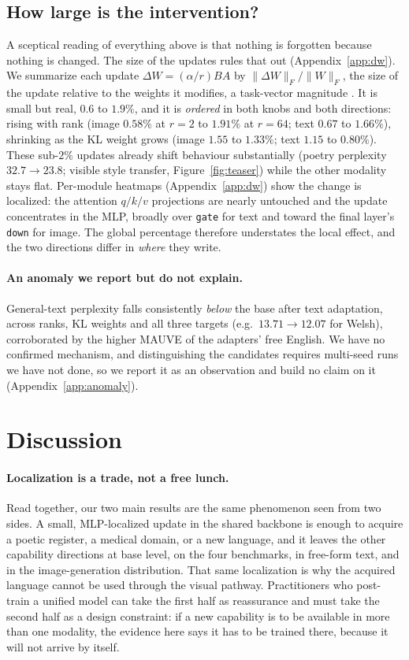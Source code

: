 \documentclass{article}
\begin{document}
\subsection{How large is the intervention?}
\label{sec:dw}
A sceptical reading of everything above is that nothing is forgotten because
nothing is changed. The size of the updates rules that out
(Appendix~\ref{app:dw}). We summarize each update
$\Delta W=(\alpha/r)BA$ by $\lVert\Delta W\rVert_F/\lVert W\rVert_F$, the size of
the update relative to the weights it modifies, a task-vector magnitude
\citep{ilharco2023task}. It is small but real, $0.6$ to $1.9\%$, and it is
\emph{ordered} in both knobs and both directions: rising with rank (image
$0.58\%$ at $r{=}2$ to $1.91\%$ at $r{=}64$; text $0.67$ to $1.66\%$), shrinking
as the KL weight grows (image $1.55$ to $1.33\%$; text $1.15$ to $0.80\%$). These
sub-$2\%$ updates already shift behaviour
substantially (poetry perplexity $32.7\to23.8$; visible style transfer,
Figure~\ref{fig:teaser}) while the other modality stays flat. Per-module heatmaps
(Appendix~\ref{app:dw}) show the change is localized: the attention $q/k/v$
projections are nearly untouched and the update concentrates in the MLP, broadly
over \texttt{gate} for text and toward the final layer's \texttt{down} for image.
The global percentage therefore understates the local effect, and the two
directions differ in \emph{where} they write.

\paragraph{An anomaly we report but do not explain.}
General-text perplexity falls consistently \emph{below} the base after text
adaptation, across ranks, KL weights and all three targets (e.g.\
$13.71\to12.07$ for Welsh), corroborated by the higher MAUVE of the adapters'
free English. We have no confirmed mechanism, and distinguishing the candidates
requires multi-seed runs we have not done, so we report it as an observation and
build no claim on it (Appendix~\ref{app:anomaly}).

\section{Discussion}
\paragraph{Localization is a trade, not a free lunch.}
Read together, our two main results are the same phenomenon seen from two sides.
A small, MLP-localized update in the shared backbone is enough to acquire a
poetic register, a medical domain, or a new language, and it leaves the other
capability directions at base level, on the four benchmarks, in free-form text,
and in the image-generation distribution. That same localization is why the
acquired language cannot be used through the visual pathway. Practitioners who
post-train a unified model can take the first half as reassurance and must take
the second half as a design constraint: if a new capability is to be available in
more than one modality, the evidence here says it has to be trained there,
because it will not arrive by itself.
\end{document}
